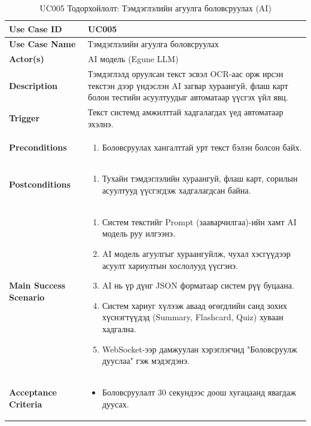 \begin{longtable}{|p{4cm}|p{11cm}|}
\caption{UC005 Тодорхойлолт: Тэмдэглэлийн агуулга боловсруулах (AI)} \\
\hline
\textbf{Use Case ID} & UC005 \\ \hline
\textbf{Use Case Name} & Тэмдэглэлийн агуулга боловсруулах \\ \hline
\textbf{Actor(s)} & AI модель (Egune LLM) \\ \hline
\textbf{Description} & Тэмдэглэлд оруулсан текст эсвэл OCR-аас орж ирсэн текстэн дээр үндэслэн AI загвар хураангуй, флаш карт болон тестийн асуултуудыг автоматаар үүсгэх үйл явц. \\ \hline
\textbf{Trigger} & Текст системд амжилттай хадгалагдах үед автоматаар эхэлнэ. \\ \hline
\textbf{Preconditions} & 
\begin{enumerate}
    \item Боловсруулах хангалттай урт текст бэлэн болсон байх.
\end{enumerate} \\ \hline
\textbf{Postconditions} & 
\begin{enumerate}
    \item Тухайн тэмдэглэлийн хураангуй, флаш карт, сорилын асуултууд үүсгэгдэж хадгалагдсан байна.
\end{enumerate} \\ \hline
\textbf{Main Success Scenario} & 
\begin{enumerate}
    \item Систем текстийг Prompt (зааварчилгаа)-ийн хамт AI модель руу илгээнэ.
    \item AI модель агуулгыг хураангуйлж, чухал хэсгүүдээр асуулт хариултын хослолууд үүсгэнэ.
    \item AI нь үр дүнг JSON форматаар систем рүү буцаана.
    \item Систем хариуг хүлээж аваад өгөгдлийн санд зохих хүснэгтүүдэд (Summary, Flashcard, Quiz) хуваан хадгална.
    \item WebSocket-ээр дамжуулан хэрэглэгчид "Боловсруулж дууслаа" гэж мэдэгдэнэ.
\end{enumerate} \\ \hline
\textbf{Acceptance Criteria} & 
\begin{itemize}
    \item Боловсруулалт 30 секундээс доош хугацаанд явагдаж дуусах.
\end{itemize} \\ \hline
\end{longtable}

